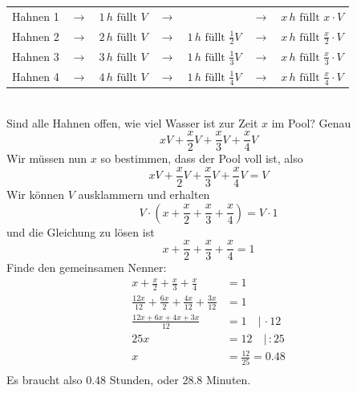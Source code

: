 \documentclass[%
11pt,%
twoside,%
titlepage,%
german,%
headsepline%
]{scrartcl}
\begin{document}
{\begin{enumerate}[a)]
\begin{tabular}{lllllll}
                                                Hahnen 1 & $\rightarrow$ &  $1\,h \mbox{ füllt } V$ & $\rightarrow$ & & $\rightarrow$ & $x\, h \mbox{ füllt } x\cdot V$\\
                                                Hahnen 2 & $\rightarrow$ &  $2\,h \mbox{ füllt } V$ &$\rightarrow$ &$1\,h \mbox{ füllt } \frac{1}{2} V$ & $\rightarrow$ & $x\, h \mbox{ füllt } \frac{x}{2}\cdot V$\\
                                                Hahnen 3 & $\rightarrow$ &  $3\,h \mbox{ füllt } V$ &$\rightarrow$ &$1\,h \mbox{ füllt } \frac{1}{3} V$ & $\rightarrow$ & $x\, h \mbox{ füllt } \frac{x}{3}\cdot V$\\
                                                Hahnen 4 & $\rightarrow$ &  $4\,h \mbox{ füllt } V$ &$\rightarrow$ &$1\,h \mbox{ füllt } \frac{1}{4} V$ & $\rightarrow$ & $x\, h \mbox{ füllt } \frac{x}{4}\cdot V$\\
                                \end{tabular}\\
                                Sind alle Hahnen offen, wie viel Wasser ist zur Zeit $x$ im Pool? Genau $$x V+\frac{x}{2}V+\frac{x}{3}V+\frac{x}{4}V$$ Wir müssen nun $x$ so bestimmen, dass der Pool voll ist, also $$x V+\frac{x}{2}V+\frac{x}{3}V+\frac{x}{4}V=V$$ Wir können $V$ ausklammern und erhalten $${V}\cdot (x +\frac{x}{2}+\frac{x}{3}+\frac{x}{4})={V}\cdot 1$$ und die Gleichung zu lösen ist $${x +\frac{x}{2}+\frac{x}{3}+\frac{x}{4}=1}$$ Finde den gemeinsamen Nenner:
                                \begin{align*}
                                x +\frac{x}{2}+\frac{x}{3}+\frac{x}{4} & =1\\
                                \frac{12x}{12}+\frac{6x}{2}+\frac{4x}{12}+\frac{3x}{12} & =1 \\
                                \frac{12x+6x+4x+3x}{12} & = 1 \quad | \, \cdot 12\\
                                25x & = 12 \quad | \, :25\\
                                x & =\frac{12}{25}={0.48}\\
                                \end{align*}
                                Es braucht also $0.48$ Stunden, oder $28.8$ Minuten. 
                \end{enumerate}
}
\end{document}
